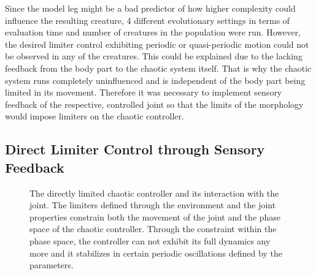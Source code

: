 \documentclass[main]{subfiles}
\begin{document}
Since the model leg might be a bad predictor of how higher complexity could influence the resulting creature, 4 different evolutionary settings in terms of evaluation time and number of creatures in the population were run. %
%
However, the desired limiter control exhibiting periodic or quasi-periodic motion could not be observed in any of the creatures. %
%
This could be explained due to the lacking feedback from the body part to the chaotic system itself. %
%
That is why the chaotic system runs completely uninfluenced and is independent of the body part being limited in its movement. %
%
Therefore it was necessary to implement sensory feedback of the respective, controlled joint so that the limits of the morphology would impose limiters on the chaotic controller.

\subsection{Direct Limiter Control through Sensory Feedback}

\begin{figure}[H]


\caption[The directly limited chaotic controller and joint complex]{The directly limited chaotic controller and its interaction with the joint. The limiters defined through the environment and the joint properties constrain both the movement of the joint and the phase space of the chaotic controller. Through the constraint within the phase space, the controller can not exhibit its full dynamics any more and it stabilizes in certain periodic oscillations defined by the parameters.}
\label{figure:direct-limit-controller-joint-complex}
\end{figure}
\end{document}
